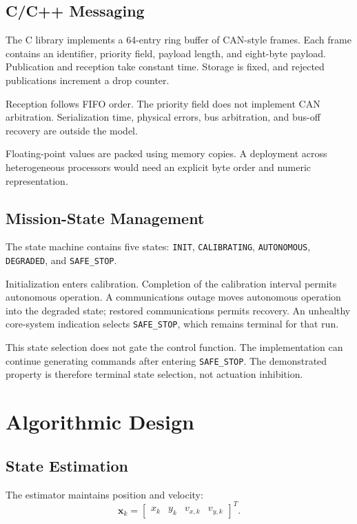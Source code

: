 \documentclass[conference]{IEEEtran}
\begin{document}
\subsection{C/C++ Messaging}

The C library implements a 64-entry ring buffer of CAN-style
frames. Each frame contains an identifier, priority field,
payload length, and eight-byte payload. Publication and
reception take constant time. Storage is fixed, and rejected
publications increment a drop counter.

Reception follows FIFO order. The priority field does not
implement CAN arbitration. Serialization time, physical
errors, bus arbitration, and bus-off recovery are outside
the model.

Floating-point values are packed using memory copies.
A deployment across heterogeneous processors would need
an explicit byte order and numeric representation.

\subsection{Mission-State Management}

The state machine contains five states:
\texttt{INIT}, \texttt{CALIBRATING},
\texttt{AUTONOMOUS}, \texttt{DEGRADED},
and \texttt{SAFE\_STOP}.

Initialization enters calibration. Completion of the
calibration interval permits autonomous operation.
A communications outage moves autonomous operation into
the degraded state; restored communications permits
recovery. An unhealthy core-system indication selects
\texttt{SAFE\_STOP}, which remains terminal for that run.

This state selection does not gate the control function.
The implementation can continue generating commands after
entering \texttt{SAFE\_STOP}. The demonstrated property is
therefore terminal state selection, not actuation inhibition.

\section{Algorithmic Design}

\subsection{State Estimation}

The estimator maintains position and velocity:
\begin{equation}
\mathbf{x}_k =
\begin{bmatrix}
x_k & y_k & v_{x,k} & v_{y,k}
\end{bmatrix}^{T}.
\end{equation}
\end{document}
